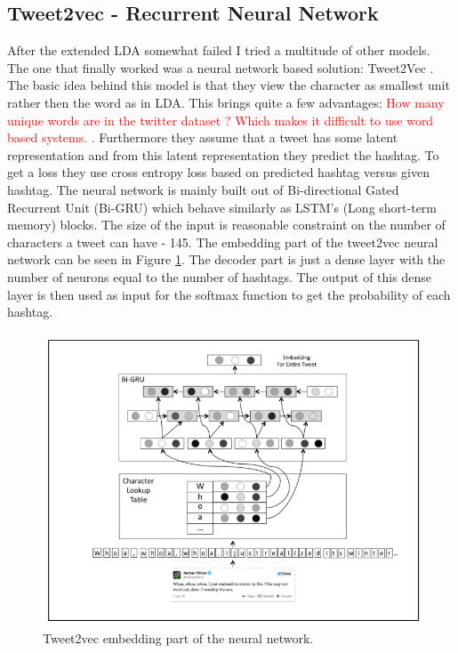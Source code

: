 \documentclass[10pt,conference,compsocconf]{IEEEtran}
\newcommand\todo[1]{\textcolor{red}{#1}}
\begin{document}
\subsection{Tweet2vec - Recurrent Neural Network}
After the extended LDA somewhat failed I tried a multitude of other models. The one that finally worked was a neural network based solution: Tweet2Vec \cite{DhingraZFMC16}. The basic idea behind this model is that they view the character as smallest unit rather then the word as in LDA. This brings quite a few advantages: \todo{How many unique words are in the twitter dataset ? Which makes it difficult to use word based systems. }. Furthermore they assume that a tweet has some latent representation and from this latent representation they predict the hashtag. To get a loss they use cross entropy loss based on predicted hashtag versus given hashtag. The neural network is mainly built out of Bi-directional Gated Recurrent Unit (Bi-GRU) which behave similarly as LSTM's (Long short-term memory) blocks. The size of the input is reasonable constraint on the number of characters a tweet can have - 145. The embedding part of the tweet2vec neural network can be seen in Figure \ref{fig:tweet2vecembedding}. The decoder part is just a dense layer with the number of neurons equal to the number of hashtags. The output of this dense layer is then used as input for the softmax function to get the probability of each hashtag. 
\begin{figure}
	\centering
	\includegraphics[width=0.7\linewidth]{images/tweet2vec_embedding}
	\caption{Tweet2vec embedding part of the neural network.}
	\label{fig:tweet2vecembedding}
\end{figure}
\end{document}
